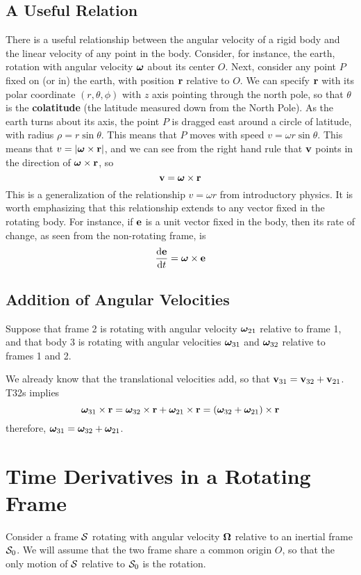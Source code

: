 \subsection*{A Useful Relation}
There is a useful relationship between the angular velocity of a rigid body and the linear velocity of any point in the body. Consider, for instance, the earth, rotation with angular velocity $\boldsymbol{\omega}$ about its center $O$. Next, consider any point $P$ fixed on (or in) the earth, with position $\mathbf{r}$ relative to $O$. We can specify $\mathbf{r}$ with its polar coordinate $(r,\theta,\phi)$ with $z$ axis pointing through the north pole, so that $\theta$ is the \textbf{colatitude} (the latitude measured down from the North Pole). As the earth turns about its axis, the point $P$ is dragged east around a circle of latitude, with radius $\rho = r\sin\theta$. This means that $P$ moves with speed $v = \omega r\sin\theta$. This means that $v= \abs{\boldsymbol{\omega} \times \mathbf{r}}$, and we can see from the right hand rule that $\mathbf{v}$ points in the direction of $\boldsymbol{\omega}\times\mathbf{r}$, so
\[ \mathbf{v} = \boldsymbol{\omega}\times\mathbf{r}\]
This is a generalization of the relationship $v=\omega r$ from introductory physics. It is worth emphasizing that this relationship extends to any vector fixed in the rotating body. For instance, if $\mathbf{e}$ is a unit vector fixed in the body, then its rate of change, as seen from the non-rotating frame, is
\[ \dv{\mathbf{e}}{t} = \boldsymbol{\omega}\times\mathbf{e}\]
\subsection*{Addition of Angular Velocities}
Suppose that frame 2 is rotating with angular velocity $\boldsymbol{\omega}_{21}$ relative to frame 1, and that body 3 is rotating with angular velocities $\boldsymbol{\omega}_{31}$ and $\boldsymbol{\omega}_{32}$ relative to frames 1 and 2.

We already know that the translational velocities add, so that $\mathbf{v}_{31} = \mathbf{v}_{32} + \mathbf{v}_{21}$. T32s implies
\[ \boldsymbol{\omega}_{31} \times \mathbf{r} = \boldsymbol{\omega}_{32}\times\mathbf{r} + \boldsymbol{\omega}_{21}\times \mathbf{r} = (\boldsymbol{\omega}_{32}+ \boldsymbol{\omega}_{21})\times\mathbf{r}\]
therefore, $\boldsymbol{\omega}_{31}=\boldsymbol{\omega}_{32}+\boldsymbol{\omega}_{21}$.
\section{Time Derivatives in a Rotating Frame}
Consider a frame $\mathcal{S}$ rotating with angular velocity $\boldsymbol{\Omega}$ relative to an inertial frame $\mathcal{S}_0$. We will assume that the two frame share a common origin $O$, so that the only motion of $\mathcal{S}$ relative to $\mathcal{S}_0$ is the rotation.


